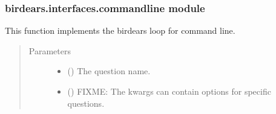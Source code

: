 \documentclass[letterpaper,10pt,english]{sphinxmanual}
\begin{document}
\subsubsection{birdears.interfaces.commandline module}
\label{\detokenize{birdears.interfaces:module-birdears.interfaces.commandline}}\label{\detokenize{birdears.interfaces:birdears-interfaces-commandline-module}}

\begin{fulllineitems}
\label{\detokenize{birdears.interfaces:birdears.interfaces.commandline.CommandLine}}
This function implements the birdears loop for command line.
\begin{quote}\begin{description}
\item[{Parameters}] \leavevmode\begin{itemize}
\item {} 
 () \textendash{} The question name.

\item {} 
 () \textendash{} FIXME: The kwargs can contain options for specific
questions.

\end{itemize}

\end{description}\end{quote}

\end{fulllineitems}

\end{document}

